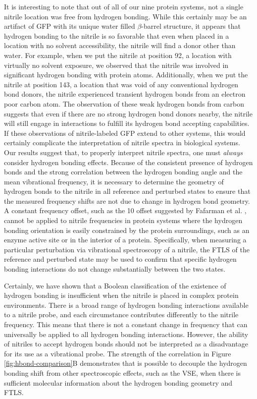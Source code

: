 It is interesting to note that out of all of our nine protein systems, not a single nitrile location was free from hydrogen bonding.
While this certainly may be an artifact of GFP with its unique water filled $\beta$-barrel structure, it appears that hydrogen bonding to the nitrile is so favorable that even when placed in a location with no solvent accessibility, the nitrile will find a donor other than water.
For example, when we put the nitrile at position 92, a location with virtually no solvent exposure, we observed that the nitrile was involved in significant hydrogen bonding with protein atoms.
Additionally, when we put the nitrile at position 143, a location that was void of any conventional hydrogen bond donors, the nitrile experienced transient hydrogen bonds from an electron poor carbon atom.
The observation of these weak hydrogen bonds from carbon suggests that even if there are no strong hydrogen bond donors nearby, the nitrile will still engage in interactions to fulfill its hydrogen bond accepting capabilities.
If these observations of nitrile-labeled GFP extend to other systems, this would certainly complicate the interpretation of nitrile spectra in biological systems.
Our results suggest that, to properly interpret nitrile spectra, one must \emph{always} consider hydrogen bonding effects.
Because of the consistent presence of hydrogen bonds and the strong correlation between the hydrogen bonding angle and the mean vibrational frequency, it is necessary to determine the geometry of hydrogen bonds to the nitrile in all reference and perturbed states to ensure that the measured frequency shifts are not due to change in hydrogen bond geometry.
A constant frequency offset, such as the 10 \si{\wn} offset suggested by Fafarman et al. \cite{Fafarman2010}, cannot be applied to nitrile frequencies in protein systems where the hydrogen bonding orientation is easily constrained by the protein surroundings, such as an enzyme active site or in the interior of a protein.
Specifically, when measuring a particular perturbation via vibrational spectroscopy of a nitrile, the FTLS of the reference and perturbed state may be used to confirm that specific hydrogen bonding interactions do not change substantially between the two states.

Certainly, we have shown that a Boolean classification of the existence of hydrogen bonding is insufficient when the nitrile is placed in complex protein environments.
There is a broad range of hydrogen bonding interactions available to a nitrile probe, and each circumstance contributes differently to the nitrile frequency.
This means that there is not a constant change in frequency that can universally be applied to all hydrogen bonding interactions.
However, the ability of nitriles to accept hydrogen bonds should not be interpreted as a disadvantage for its use as a vibrational probe.
The strength of the correlation in Figure \ref{fig:hbond-comparison}B demonstrates that is possible to decouple the hydrogen bonding shift from other spectroscopic effects, such as the VSE, when there is sufficient molecular information about the hydrogen bonding geometry and FTLS.

